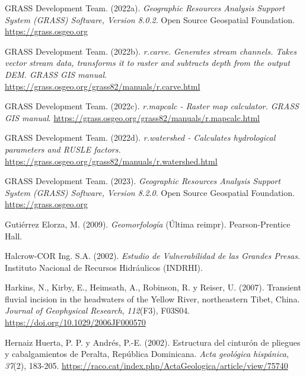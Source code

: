 \documentclass[spanish]{article}
\newlength{\cslhangindent}
\newlength{\cslentryspacingunit} %
\newenvironment{CSLReferences}[2] %
 {%
  \setlength{\parindent}{0pt}
  \ifodd #1
  \let\oldpar\par
  \def\par{\hangindent=\cslhangindent\oldpar}
  \fi
  \setlength{\parskip}{#2\cslentryspacingunit}
 }%
 {}
\begin{document}
\begin{CSLReferences}{1}{0}
\leavevmode{}%
GRASS Development Team. (2022a). \emph{Geographic Resources Analysis
Support System (GRASS) Software, Version 8.0.2}. Open Source Geospatial
Foundation. \url{https://grass.osgeo.org}

\leavevmode{}%
GRASS Development Team. (2022b). \emph{r.carve. Generates stream
channels. Takes vector stream data, transforms it to raster and
subtracts depth from the output DEM. GRASS GIS manual}.
\url{https://grass.osgeo.org/grass82/manuals/r.carve.html}

\leavevmode{}%
GRASS Development Team. (2022c). \emph{r.mapcalc - Raster map
calculator. GRASS GIS manual}.
\url{https://grass.osgeo.org/grass82/manuals/r.mapcalc.html}

\leavevmode{}%
GRASS Development Team. (2022d). \emph{r.watershed - Calculates
hydrological parameters and RUSLE factors.}
\url{https://grass.osgeo.org/grass82/manuals/r.watershed.html}

\leavevmode{}%
GRASS Development Team. (2023). \emph{Geographic Resources Analysis
Support System (GRASS) Software, Version 8.2.0}. Open Source Geospatial
Foundation. \url{https://grass.osgeo.org}

\leavevmode{}%
Gutiérrez Elorza, M. (2009). \emph{Geomorfología} (Última reimpr).
Pearson-Prentice Hall.

\leavevmode{}%
Halcrow-COR Ing. S.A. (2002). \emph{{Estudio de Vulnerabilidad de las
Grandes Presas}}. {Instituto Nacional de Recursos Hidráulicos (INDRHI)}.

\leavevmode{}%
Harkins, N., Kirby, E., Heimsath, A., Robinson, R. y Reiser, U. (2007).
Transient fluvial incision in the headwaters of the {Yellow} {River},
northeastern {Tibet}, {China}. \emph{Journal of Geophysical Research},
\emph{112}(F3), F03S04. \url{https://doi.org/10.1029/2006JF000570}

\leavevmode{}%
Hernaiz Huerta, P. P. y Andrés, P.-E. (2002). Estructura del cinturón de
pliegues y cabalgamientos de Peralta, República Dominicana. \emph{Acta
geológica hispánica}, \emph{37}(2), 183-205.
\url{https://raco.cat/index.php/ActaGeologica/article/view/75740}


\end{CSLReferences}
\end{document}
